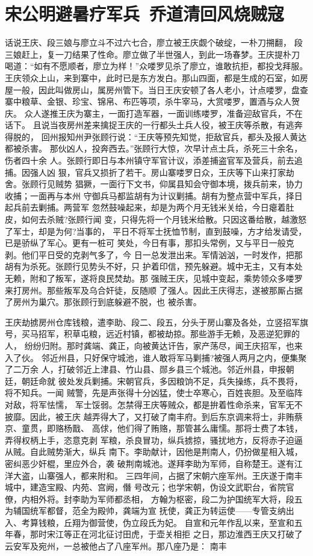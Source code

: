 \chapter{宋公明避暑疗军兵~乔道清回风烧贼寇}

话说王庆、段三娘与廖立斗不过六七合，廖立被王庆觑个破绽，一朴刀搠翻，
段三娘赶上，复一刀结果了性命。廖立做了半世强人，到此一场春梦。王庆提朴刀
喝道：“如有不愿顺者，廖立为样！”众喽罗见杀了廖立，谁敢抗拒，都投戈拜服。
王庆领众上山，来到寨中，此时已是东方发白。那山四面，都是生成的石室，如房
屋一般，因此叫做房山，属房州管下。当日王庆安顿了各人老小，计点喽罗，盘查
寨中粮草、金银、珍宝、锦帛、布匹等项，杀牛宰马，大赏喽罗，置酒与众人贺庆。
众人遂推王庆为寨主，一面打造军器，一面训练喽罗，准备迎敌官兵，不在话下。
且说当夜房州差来擒捉王庆的一行都头土兵人役，被王庆等杀散，有逃奔得脱的，
回州报知州尹张顾行说：“王庆等预先知觉，拒敌官兵，都头及报人黄达都被杀害。
那伙凶人，投奔西去。”张顾行大惊，次早计点土兵，杀死三十余名，伤者四十余
人。张顾行即日与本州镇守军官计议，添差捕盗官军及营兵，前去追捕。因强人凶
狠，官兵又损折了若干。房山寨喽罗日众，王庆等下山来打家劫舍。张顾行见贼势
猖獗，一面行下文书，仰属县知会守御本境，拨兵前来，协力收捕；一面再与本州
守御兵马都监胡有为计议剿捕。胡有为整点营中军兵，择日起兵前去剿捕。两营军
忽然鼓噪起来，却是为两个月无钱米关给，今日瘪着肚皮，如何去杀贼?张顾行闻
变，只得先将一个月钱米给散。只因这番给散，越激怒了军士，却是为何?当事的，
平日不将军士抚恤节制，直到鼓噪，方才给发请受，已是骄纵了军心。更有一桩可
笑处，今日有事，那扣头常例，又与平日一般克剥。他们平日受的克剥气多了，今
日一总发泄出来。军情汹汹，一时发作，把那胡有为杀死。张顾行见势头不好，只
护着印信，预先躲避。城中无主，又有本处无赖，附和了叛军，遂将良民焚劫。那
强贼王庆，见城中变起，乘势领众多喽罗来打房州。那些叛军及乌合奸徒，反随顺
了强人。因此王庆得志，遂被那厮占据了房州为巢穴。那张顾行到底躲避不脱，也
被杀害。

王庆劫掳房州仓库钱粮，遣李助、段二、段五，分头于房山寨及各处，立竖招军旗
号，买马招军，积草屯粮，远近村镇，都被劫掠。那些游手无赖，及恶逆犯罪的人，
纷纷归附。那时龚端、龚正，向被黄达讦告，家产荡尽，闻王庆招军，也来入了伙。
邻近州县，只好保守城池，谁人敢将军马剿捕?被强人两月之内，便集聚了二万余
人，打破邻近上津县、竹山县、郧乡县三个城池。邻近州县，申报朝廷，朝廷命就
彼处发兵剿捕。宋朝官兵，多因粮饷不足，兵失操练，兵不畏将，将不知兵。一闻
贼警，先是声张得十分凶猛，使士卒寒心，百姓丧胆。及至临阵对敌，将军怯懦，
军士馁弱。怎禁得王庆等贼众，都是拚着性命杀来，官军无不披靡。因此，被王庆
越弄得大了，又打破了南丰府。到后东京调来将士，非贿蔡京、童贯，即赂杨戬、
高俅，他们得了贿赂，那管甚么庸懦。那将士费了本钱，弄得权柄上手，恣意克剥
军粮，杀良冒功，纵兵掳掠，骚扰地方，反将赤子迫逼从贼。自此贼势渐大，纵兵
南下。李助献计，因他是荆南人，仍扮做星相入城，密纠恶少奸棍，里应外合，袭
破荆南城池。遂拜李助为军师，自称楚王。遂有江洋大盗，山寨强人，都来附和。
三四年间，占据了宋朝六座军州。王庆遂于南丰城中，建造宝殿、内苑、宫阙，僭
号改元；也学宋朝，伪设文武职台，省院官僚，内相外将。封李助为军师都丞相，
方翰为枢密，段二为护国统军大将，段五为辅国统军都督，范全为殿帅，龚端为宣
抚使，龚正为转运使——专管支纳出入、考算钱粮，丘翔为御营使，伪立段氏为妃。
自宣和元年作乱以来，至宣和五年春，那时宋江等正在河北征讨田虎，于壶关相拒
之日，那边淮西王庆又打破了云安军及宛州，一总被他占了八座军州。那八座乃是：
南丰

